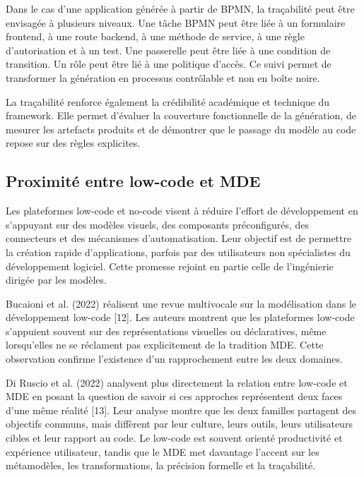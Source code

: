 Dans le cas d'une application générée à partir de BPMN, la traçabilité peut être envisagée à plusieurs niveaux. Une tâche BPMN peut être liée à un formulaire frontend, à une route backend, à une méthode de service, à une règle d'autorisation et à un test. Une passerelle peut être liée à une condition de transition. Un rôle peut être lié à une politique d'accès. Ce suivi permet de transformer la génération en processus contrôlable et non en boîte noire.

La traçabilité renforce également la crédibilité académique et technique du framework. Elle permet d'évaluer la couverture fonctionnelle de la génération, de mesurer les artefacts produits et de démontrer que le passage du modèle au code repose sur des règles explicites.


\subsection{Proximité entre low-code et MDE}

Les plateformes low-code et no-code visent à réduire l'effort de développement en s'appuyant sur des modèles visuels, des composants préconfigurés, des connecteurs et des mécanismes d'automatisation. Leur objectif est de permettre la création rapide d'applications, parfois par des utilisateurs non spécialistes du développement logiciel. Cette promesse rejoint en partie celle de l'ingénierie dirigée par les modèles.

Bucaioni et al. (2022) réalisent une revue multivocale sur la modélisation dans le développement low-code [12]. Les auteurs montrent que les plateformes low-code s'appuient souvent sur des représentations visuelles ou déclaratives, même lorsqu'elles ne se réclament pas explicitement de la tradition MDE. Cette observation confirme l'existence d'un rapprochement entre les deux domaines.

Di Ruscio et al. (2022) analysent plus directement la relation entre low-code et MDE en posant la question de savoir si ces approches représentent deux faces d'une même réalité [13]. Leur analyse montre que les deux familles partagent des objectifs communs, mais diffèrent par leur culture, leurs outils, leurs utilisateurs cibles et leur rapport au code. Le low-code est souvent orienté productivité et expérience utilisateur, tandis que le MDE met davantage l'accent sur les métamodèles, les transformations, la précision formelle et la traçabilité.

